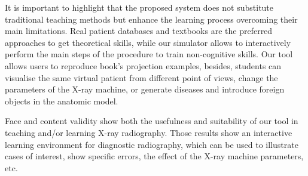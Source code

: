 It is important to highlight that the proposed system does not substitute traditional teaching methods but enhance the learning process overcoming their main limitations. Real patient databases and textbooks are the preferred approaches to get theoretical skills, while our simulator allows to interactively perform the main steps of the procedure to train non-cognitive skills. Our tool allows users to reproduce book's projection examples, besides, students can visualise the same virtual patient from different point of views, change the parameters of the X-ray machine, or generate diseases and introduce foreign objects in the anatomic model.

Face and content validity show both the usefulness and suitability of our tool in teaching and/or learning X-ray radiography.  Those results show an interactive learning environment for diagnostic radiography, which can be used to illustrate cases of interest, show specific errors, the effect of the X-ray machine parameters, etc.










